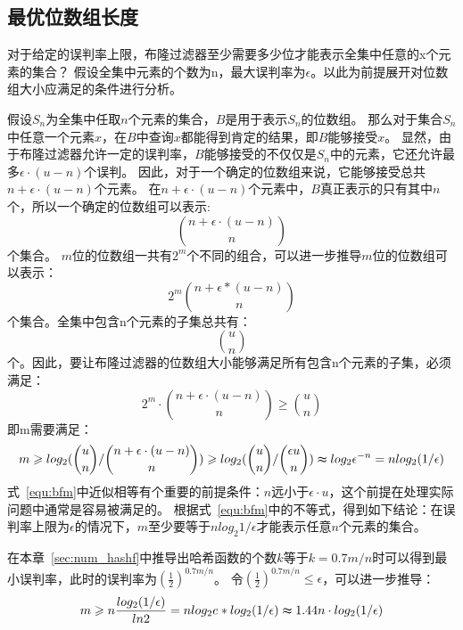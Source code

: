\subsection{最优位数组长度}
\label{sec:opt_m}
对于给定的误判率上限，布隆过滤器至少需要多少位才能表示全集中任意的x个元素的集合？
假设全集中元素的个数为n，最大误判率为$\epsilon$。以此为前提展开对位数组大小应满足的条件进行分析。

假设$S_n$为全集中任取$n$个元素的集合，$B$是用于表示$S_n$的位数组。
那么对于集合$S_n$中任意一个元素$x$，在$B$中查询$x$都能得到肯定的结果，即$B$能够接受$x$。
显然，由于布隆过滤器允许一定的误判率，$B$能够接受的不仅仅是$S_n$中的元素，它还允许最多$\epsilon \cdot(u - n)$个误判。
因此，对于一个确定的位数组来说，它能够接受总共$n +\epsilon\cdot(u - n)$个元素。
在$n + \epsilon\cdot(u - n)$个元素中，$B$真正表示的只有其中$n$个，所以一个确定的位数组可以表示:
\begin{equation}
\binom{n + \epsilon \cdot(u - n)}{n}
\end{equation}
个集合。
$m$位的位数组一共有$2^m$个不同的组合，可以进一步推导$m$位的位数组可以表示：
\begin{equation}
2^m\binom{n + \epsilon *\left(u - n\right)}{n}
\end{equation}
个集合。全集中包含n个元素的子集总共有：
\begin{equation}
\binom{u}{n}
\end{equation}
个。因此，要让布隆过滤器的位数组大小能够满足所有包含n个元素的子集，必须满足：
\begin{equation}
2^m\cdot\binom{n + \epsilon \cdot(u - n)}{n} \geq \binom{u}{n}
\end{equation}
即m需要满足：
\begin{equation}
m \geq log_2({\binom{u}{n}/\binom{n + \epsilon \cdot(u - n)}{n}}) \geq log_2({\binom{u}{n}/\binom{\epsilon u}{n}}) \thickapprox log_2\epsilon^{-n} = n log_2({1/\epsilon})
\label{equ:bfm}
\end{equation}
式~\ref{equ:bfm}中近似相等有个重要的前提条件：$n$远小于$\epsilon\cdot u$，这个前提在处理实际问题中通常是容易被满足的。
根据式~\ref{equ:bfm}中的不等式，得到如下结论：在误判率上限为$\epsilon$的情况下，$m$至少要等于$nlog_2{1/\epsilon}$才能表示任意$n$个元素的集合。

在本章~\ref{sec:num_hashf}中推导出哈希函数的个数$k$等于$k = 0.7{m/n}$时可以得到最小误判率，此时的误判率为$(\frac{1}{2})^{0.7{m/n}}$。
令$(\frac{1}{2})^{0.7{m/n}} \leq \epsilon $，可以进一步推导：
\begin{equation}
m \geq n\frac{log_2({1/\epsilon})}{ln2} = nlog_2e\ast log_2({1/\epsilon}) \thickapprox 1.44n\cdot log_2({1/\epsilon})
\label{equ:bfm2}
\end{equation}

